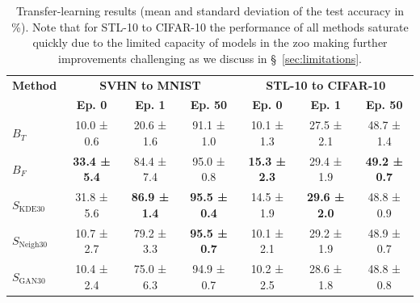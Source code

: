 \documentclass{article}
\begin{document}
\begin{table}[ht!]
\centering
\caption{Transfer-learning results (mean and standard deviation of the test accuracy in \%). Note that for STL-10 to CIFAR-10 the performance of all methods saturate quickly due to the limited capacity of models in the zoo making further improvements challenging as we discuss in \S~\ref{sec:limitations}.
}
\label{tab:transfer}
{\small
\setlength{\tabcolsep}{10pt}
\centering
\begin{tabular}{lcccccc}
\toprule

\textbf{Method} & \multicolumn{3}{c}{\textbf{SVHN to MNIST}} & \multicolumn{3}{c}{\textbf{STL-10 to CIFAR-10}} \\
\cmidrule(r){1-1} \cmidrule(rl){2-4} \cmidrule(l){5-7} 
                  & \textbf{Ep. 0}          & \textbf{Ep. 1}        & \textbf{Ep. 50}       & \textbf{Ep. 0}        & \textbf{Ep. 1} & \textbf{Ep. 50}        \\
\cmidrule(r){1-1} \cmidrule(rl){2-2} \cmidrule(rl){3-3} \cmidrule(rl){4-4} \cmidrule(rl){5-5} \cmidrule(rl){6-6} \cmidrule(rl){7-7} 
$B_T$  & 10.0 ± 0.6         & 20.6 ± 1.6 & 91.1 ± 1.0         & 10.1 ± 1.3  & 27.5 ± 2.1 & {48.7 ± 1.4} \\ 
$B_F$    & \textbf{33.4 ± 5.4} & 84.4 ± 7.4 & 95.0 ± 0.8 & \textbf{15.3 ± 2.3} & {29.4 ± 1.9} & \textbf{49.2 ± 0.7} \\

\cmidrule(r){1-1} \cmidrule(rl){2-2} \cmidrule(rl){3-3} \cmidrule(rl){4-4} \cmidrule(rl){5-5} \cmidrule(rl){6-6} \cmidrule(rl){7-7} 
$S_{\text{KDE}30}$   & 31.8 ± 5.6          & \textbf{86.9 ± 1.4} & \textbf{95.5 ± 0.4} & {14.5 ± 1.9} & \textbf{29.6 ± 2.0} & {48.8 ± 0.9} \\
$S_{\text{Neigh}30}$ & 10.7 ± 2.7          & 79.2 ± 3.3  & \textbf{95.5 ± 0.7}          & 10.1 ± 2.1          & {29.2 ± 1.9} & {48.9 ± 0.7}  \\
$S_{\text{GAN}30}$   & 10.4 ± 2.4          & 75.0 ± 6.3 & 94.9 ± 0.7          & 10.2 ± 2.5          & {28.6 ± 1.8} & {48.8 ± 0.8} \\
\bottomrule

\end{tabular}
}
\end{table}
\end{document}
